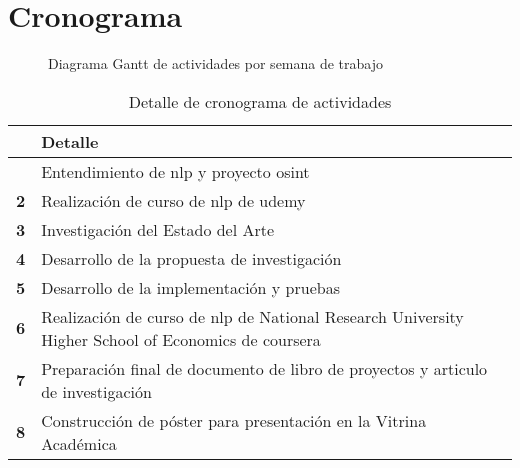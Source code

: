 \chapter{Cronograma} %

\label{ch:Schedule} %


\begin{figure}[h!]
\caption{Diagrama Gantt de actividades por semana de trabajo}
\label{fig:gantt}
\end{figure}

\vspace{1cm}

\begin{table}[h!]
\begin{center}
\begin{tabular}{|>{\centering\arraybackslash}p{}|p{}|} \hline
  & \textbf{Detalle} \\ \hline
  {\bf 1} & Entendimiento de \gls{nlp} y proyecto \gls{osint} \\ \hline
  
  {\bf 2} & Realización de curso de \gls{nlp} de \gls{udemy} \\ \hline
  
  {\bf 3} & Investigación del Estado del Arte \\ \hline
  
  {\bf 4} & Desarrollo de la propuesta de investigación \\ \hline
  
  {\bf 5} & Desarrollo de la implementación y pruebas \\ \hline
  
  {\bf 6} & Realización de curso de \gls{nlp} de National Research University Higher School of Economics
            de \gls{coursera} \\ \hline
  
  {\bf 7} & Preparación final de documento de libro de proyectos y articulo de investigación \\ \hline
  
  {\bf 8} & Construcción de póster para presentación en la Vitrina Académica \\ \hline
\end{tabular}
\end{center}
\caption{Detalle de cronograma de actividades}
\label{table:schedule}
\end{table}